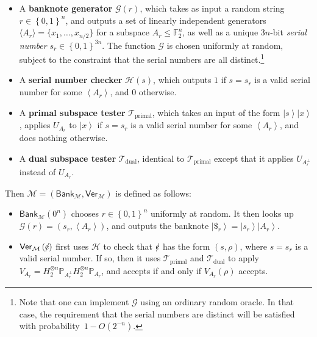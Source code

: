 \documentclass[10pt]{article}
\theoremstyle{definition}
\numberwithin{equation}{section}
\begin{document}
\begin{itemize}
\item A \textbf{banknote generator} $\mathcal{G}\left(  r\right)  $, which
takes as input a random string $r\in\left\{  0,1\right\}  ^{n}$, and outputs a
set of linearly independent generators $\langle A_{r}\rangle
=\{  x_{1},\ldots,x_{n/2}\}  $ for a subspace $A_{r}\leq
\mathbb{F}_{2}^{n}$, as well as a unique $3n$-bit \emph{serial number}
$s_{r}\in\left\{  0,1\right\}  ^{3n}$. The function $\mathcal{G}$ is chosen
uniformly at random, subject to the constraint that the serial numbers are all
distinct.\footnote{Note that one can implement $\mathcal{G}$ using an
ordinary random oracle. In that case, the requirement that the serial
numbers are distinct will be satisfied with probability\ $1-O\left(
2^{-n}\right)  $.}

\item A \textbf{serial number checker} $\mathcal{H}\left(  s\right)  $, which
outputs $1$ if $s=s_{r}$ is a valid serial number for some $\left\langle
A_{r}\right\rangle $, and $0$ otherwise.

\item A \textbf{primal subspace tester} $\mathcal{T}_{\operatorname*{primal}}%
$, which takes an input of the form $\left\vert s\right\rangle \left\vert
x\right\rangle $, applies $U_{A_{r}}$ to $\left\vert x\right\rangle $ if
$s=s_{r}$ is a valid serial number for some $\left\langle A_{r}\right\rangle
$, and does nothing otherwise.

\item A \textbf{dual subspace tester} $\mathcal{T}_{\operatorname*{dual}}$,
identical to $\mathcal{T}_{\operatorname*{primal}}$ except that it applies
$U_{A_{r}^{\bot}}$ instead of $U_{A_{r}}$.
\end{itemize}

Then $\mathcal{M}=\left(  \mathsf{Bank}_{\mathcal{M}},\mathsf{Ver}%
_{\mathcal{M}}\right)  $ is defined as follows:

\begin{itemize}
\item $\mathsf{Bank}_{\mathcal{M}}\left(  0^{n}\right)  $ chooses
$r\in\left\{  0,1\right\}  ^{n}$ uniformly at random. It then looks up
$\mathcal{G}\left(  r\right)  =\left(  s_{r},\left\langle A_{r}\right\rangle
\right)  $, and outputs the banknote $\left\vert \$_{r}\right\rangle
=\left\vert s_{r}\right\rangle \left\vert A_{r}\right\rangle $.

\item $\mathsf{Ver}_{\mathcal{M}}\left(
%
%
\hbox{\rm\rlap/c}%
%
\right)  $ first uses $\mathcal{H}$ to check that $%
%
%
\hbox{\rm\rlap/c}%
%
$ has the form $\left(  s,\rho\right)  $, where $s=s_{r}$ is a valid serial
number. If so, then it uses $\mathcal{T}_{\operatorname*{primal}}$ and
$\mathcal{T}_{\operatorname*{dual}}$ to apply $V_{A_{r}}=H_{2}^{\otimes
n}\mathbb{P}_{A_{r}^{\bot}}H_{2}^{\otimes n}\mathbb{P}_{A_{r}}$, and accepts
if and only if $V_{A_{r}}\left(  \rho\right)  $ accepts.
\end{itemize}
\end{document}
